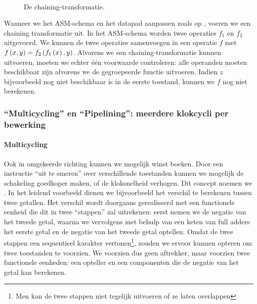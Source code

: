\paragraph{}
\begin{figure}[hbt]
\centering
{}
\caption{De chaining-transformatie.}
\end{figure}
Wanneer we het ASM-schema en het datapad aanpassen zoals op , voeren we een chaining transformatie uit. In het ASM-schema worden twee operaties $f_1$ en $f_2$ uitgevoerd. We kunnen de twee operaties samenvoegen in een operatie $f$ met $f\left( x,y \right)=f_2\left( f_1\left( x \right),y \right)$. Alvorens we een chaining-transformatie kunnen uitvoeren, moeten we echter \'e\'en voorwaarde controleren: alle operanden moeten beschikbaar zijn alvorens we de gegroepeerde functie uitvoeren. Indien $z$ bijvoorbeeld nog niet beschikbaar is in de eerste toestand, kunnen we $f$ nog niet berekenen.
\subsubsection{``Multicycling'' en ``Pipelining'': meerdere klokcycli per bewerking}
\paragraph{Multicycling}
Ook in omgekeerde richting kunnen we mogelijk winst boeken. Door een instructie ``uit te smeren'' over verschillende toestanden kunnen we mogelijk de schakeling goedkoper maken, of de kloksnelheid verhogen. Dit concept noemen we . In het leidend voorbeeld dienen we bijvoorbeeld het verschil te berekenen tussen twee getallen. Het verschil wordt doorgaans gerealiseerd met een functionele eenheid die dit in twee ``stappen'' zal uitrekenen: eerst nemen we de negatie van het tweede getal, waarna we vervolgens met behulp van een keten van full adders het eerste getal en de negatie van het tweede getal optellen. Omdat de twee stappen een sequentieel karakter vertonen\footnote{Men kan de twee stappen niet tegelijk uitvoeren of ze laten overlappen}, zouden we ervoor kunnen opteren om twee toestanden te voorzien. We voorzien dus geen aftrekker, maar voorzien twee functionele eenheden: een opteller en een componenten die de negatie van het getal kan berekenen.
